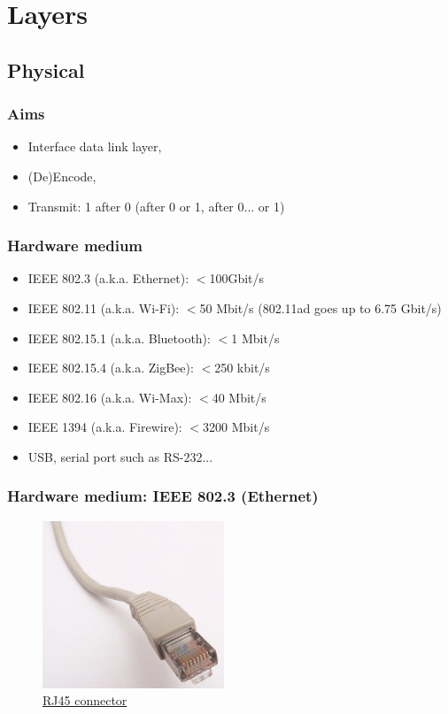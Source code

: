 \section{Layers}
\subsection{Physical}
  \begin{frame}
    \frametitle{Aims}
      \begin{itemize}
        \item Interface data link layer,\pause
        \item (De)Encode,\pause
        \item Transmit: 1 after 0 (after 0 or 1, after 0... or 1)
      \end{itemize}
  \end{frame}
  \begin{frame}
    \frametitle{Hardware medium}
      \begin{itemize}
        \item IEEE 802.3 (a.k.a. Ethernet): $<$100Gbit/s \pause
        \item IEEE 802.11 (a.k.a. Wi-Fi): $<$50 Mbit/s (802.11ad goes up to 6.75 Gbit/s) \pause
        \item IEEE 802.15.1 (a.k.a. Bluetooth): $<$1 Mbit/s \pause
        \item IEEE 802.15.4 (a.k.a. ZigBee): $<$250 kbit/s \pause
        \item IEEE 802.16 (a.k.a. Wi-Max): $<$40 Mbit/s \pause
        \item IEEE 1394 (a.k.a. Firewire): $<$3200 Mbit/s \pause
        \item USB, serial port such as RS-232...
      \end{itemize}
  \end{frame}
  \begin{frame}
    \frametitle{Hardware medium: IEEE 802.3 (Ethernet)}
    \begin{figure}[t]
      \centering
      \includegraphics[height=5cm]{./imgs/rj45.jpg}
      \caption{\color{blue}\href{https://en.wikipedia.org/wiki/File:Ethernet_RJ45_connector_p1160054.jpg}{RJ45 connector}}
      \label{fig:rj45}
    \end{figure}
  \end{frame}
